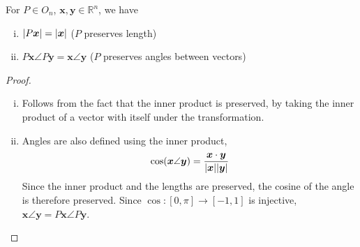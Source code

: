 \documentclass{article}
\begin{document}
\begin{corollary}
	For $P \in O_n$, $\bm x, \bm y \in \mathbb R^n$, we have
	\begin{enumerate}[(i)]
		\item $\abs{P\bm x} = \abs{\bm x}$ ($P$ preserves length)
		\item $P\bm x \angle P\bm y = \bm x \angle \bm y$ ($P$ preserves angles between vectors)
	\end{enumerate}
	\begin{proof}
		\begin{enumerate}[(i)]
			\item Follows from the fact that the inner product is preserved, by taking the inner product of a vector with itself under the transformation.
			\item Angles are also defined using the inner product,
			      \[ \cos (\bm x \angle \bm y) = \frac{\bm x \cdot \bm y}{\abs{\bm x}\abs{\bm y}} \]
			      Since the inner product and the lengths are preserved, the cosine of the angle is therefore preserved. Since $\cos\colon [0, \pi] \to [-1, 1]$ is injective, $\bm x \angle \bm y = P\bm x \angle P\bm y$.
		\end{enumerate}
	\end{proof}
\end{corollary}
\end{document}
